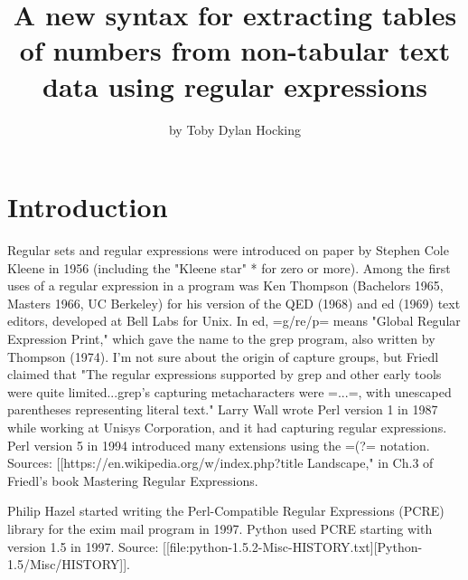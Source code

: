 \title{A new syntax for extracting tables of numbers from non-tabular text data using regular expressions}
\author{by Toby Dylan Hocking}

\maketitle


\section{Introduction}

Regular sets and regular expressions were introduced on paper by
Stephen Cole Kleene in 1956 (including the "Kleene star" * for zero
or more). Among the first uses of a regular expression in a program
was Ken Thompson (Bachelors 1965, Masters 1966, UC Berkeley) for his
version of the QED (1968) and ed (1969) text editors, developed at
Bell Labs for Unix. In ed, =g/re/p= means "Global Regular Expression
Print," which gave the name to the grep program, also written by
Thompson (1974). I'm not sure about the origin of capture groups, but
Friedl claimed that "The regular expressions supported by grep and
other early tools were quite limited...grep's capturing metacharacters
were =\(...\)=, with unescaped parentheses representing literal
text." Larry Wall wrote Perl version 1 in 1987 while working at Unisys
Corporation, and it had capturing regular expressions. Perl version 5
in 1994 introduced many extensions using the =(?= notation. Sources:
[[https://en.wikipedia.org/w/index.php?title%
Landscape," in Ch.3 of Friedl's book Mastering Regular Expressions.

Philip Hazel started writing the Perl-Compatible Regular Expressions
(PCRE) library for the exim mail program in 1997. Python used PCRE
starting with version 1.5 in 1997. Source: [[file:python-1.5.2-Misc-HISTORY.txt][Python-1.5/Misc/HISTORY]].

